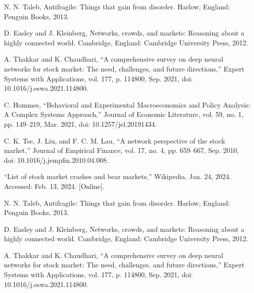 \documentclass[letterpaper, 10 pt, proceedings]{ieeetran}  %
\begin{document}
	\begin{thebibliography}{99}	
		N. N. Taleb, Antifragile: Things that gain from disorder. Harlow, England: Penguin Books, 2013.
		
		D. Easley and J. Kleinberg, Networks, crowds, and markets: Reasoning about a highly connected world. Cambridge, England: Cambridge University Press, 2012.
		
		A. Thakkar and K. Chaudhari, “A comprehensive survey on deep neural networks for stock market: The need, challenges, and future directions,” Expert Systems with Applications, vol. 177, p. 114800, Sep. 2021, doi: 10.1016/j.eswa.2021.114800.
		
		C. Hommes, “Behavioral and Experimental Macroeconomics and Policy Analysis: A Complex Systems Approach,” Journal of Economic Literature, vol. 59, no. 1, pp. 149–219, Mar. 2021, doi: 10.1257/jel.20191434.
		
		C. K. Tse, J. Liu, and F. C. M. Lau, “A network perspective of the stock market,” Journal of Empirical Finance, vol. 17, no. 4, pp. 659–667, Sep. 2010, doi: 10.1016/j.jempfin.2010.04.008.
		
		“List of stock market crashes and bear markets,” Wikipedia. Jan. 24, 2024. Accessed: Feb. 13, 2024. [Online].
		
		N. N. Taleb, Antifragile: Things that gain from disorder. Harlow, England: Penguin Books, 2013.
		
		D. Easley and J. Kleinberg, Networks, crowds, and markets: Reasoning about a highly connected world. Cambridge, England: Cambridge University Press, 2012.
		
		A. Thakkar and K. Chaudhari, “A comprehensive survey on deep neural networks for stock market: The need, challenges, and future directions,” Expert Systems with Applications, vol. 177, p. 114800, Sep. 2021, doi: 10.1016/j.eswa.2021.114800.
		

\end{thebibliography}
\end{document}
